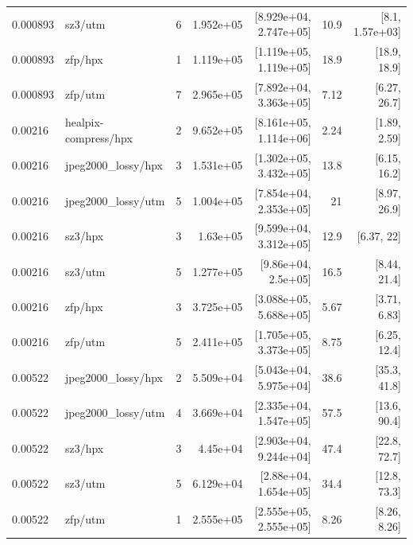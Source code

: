 \begin{table}[t]
\begin{tabular}{@{}llrrrrr@{}}
0.000893 & sz3/utm & 6 & 1.952e+05 & [8.929e+04, 2.747e+05] & 10.9 & [8.1, 1.57e+03] \\
0.000893 & zfp/hpx & 1 & 1.119e+05 & [1.119e+05, 1.119e+05] & 18.9 & [18.9, 18.9] \\
0.000893 & zfp/utm & 7 & 2.965e+05 & [7.892e+04, 3.363e+05] & 7.12 & [6.27, 26.7] \\
0.00216 & healpix-compress/hpx & 2 & 9.652e+05 & [8.161e+05, 1.114e+06] & 2.24 & [1.89, 2.59] \\
0.00216 & jpeg2000_lossy/hpx & 3 & 1.531e+05 & [1.302e+05, 3.432e+05] & 13.8 & [6.15, 16.2] \\
0.00216 & jpeg2000_lossy/utm & 5 & 1.004e+05 & [7.854e+04, 2.353e+05] & 21 & [8.97, 26.9] \\
0.00216 & sz3/hpx & 3 & 1.63e+05 & [9.599e+04, 3.312e+05] & 12.9 & [6.37, 22] \\
0.00216 & sz3/utm & 5 & 1.277e+05 & [9.86e+04, 2.5e+05] & 16.5 & [8.44, 21.4] \\
0.00216 & zfp/hpx & 3 & 3.725e+05 & [3.088e+05, 5.688e+05] & 5.67 & [3.71, 6.83] \\
0.00216 & zfp/utm & 5 & 2.411e+05 & [1.705e+05, 3.373e+05] & 8.75 & [6.25, 12.4] \\
0.00522 & jpeg2000_lossy/hpx & 2 & 5.509e+04 & [5.043e+04, 5.975e+04] & 38.6 & [35.3, 41.8] \\
0.00522 & jpeg2000_lossy/utm & 4 & 3.669e+04 & [2.335e+04, 1.547e+05] & 57.5 & [13.6, 90.4] \\
0.00522 & sz3/hpx & 3 & 4.45e+04 & [2.903e+04, 9.244e+04] & 47.4 & [22.8, 72.7] \\
0.00522 & sz3/utm & 5 & 6.129e+04 & [2.88e+04, 1.654e+05] & 34.4 & [12.8, 73.3] \\
0.00522 & zfp/utm & 1 & 2.555e+05 & [2.555e+05, 2.555e+05] & 8.26 & [8.26, 8.26] \\
\bottomrule
\end{tabular}
\end{table}
